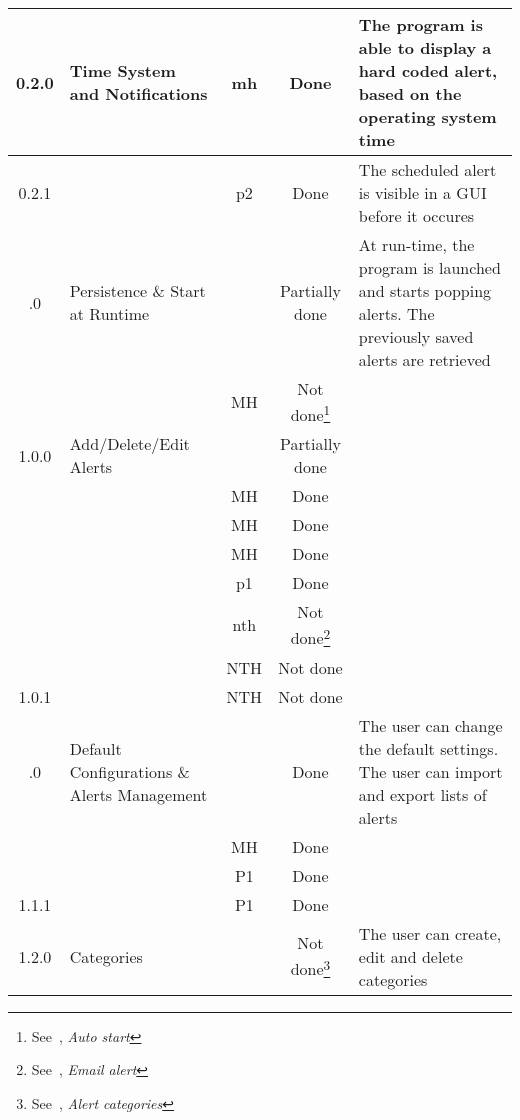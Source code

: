 \begin{longtable}{| c | p{5cm} | c | c | p{5cm} |}
	\rowcolor{aliceblue}0.2.0 & Time System and Notifications & \gls{mh} & Done & The program is able to display a hard coded alert, based on the operating system time \\ \hline
	\rowcolor{aliceblue}0.2.1 & \fullref{subsec:usecase_launch} & \gls{p2} & Done & The scheduled alert is visible in a GUI before it occures \\ \boldhr
	0.3.0 & Persistence \& Start at Runtime & & Partially done & At run-time, the program is launched and starts popping alerts. The previously saved alerts are retrieved \\ \hline
	& \fullref{subsec:usecase_auto_start} & MH & Not done\footnote{\label{ftn:autostart}See~\fullref{sec:unimplreq}, \textit{Auto start}} & \\ \boldhr
	\rowcolor{aliceblue}1.0.0 & Add/Delete/Edit Alerts & & Partially done &  \\ \hline
	\rowcolor{aliceblue}& \fullref{subsec:usecase_add_simple_alert} & MH & Done &  \\ \hline
	\rowcolor{aliceblue}& \fullref{subsec:usecase_delete_simple_alert} & MH & Done &  \\ \hline
	\rowcolor{aliceblue}& \fullref{subsec:usecase_edit_simple_alert} & MH & Done &  \\ \hline
	\rowcolor{aliceblue}& \fullref{subsec:usecase_add_periodic_alert} & \gls{p1} & Done &  \\ \hline
	\rowcolor{aliceblue}& \fullref{subsec:usecase_add_email_sender} & \gls{nth} & Not done\footnote{\label{ftn:emailreq}See~\fullref{sec:unimplreq}, \textit{Email alert}} &  \\ \hline
	\rowcolor{aliceblue}& \fullref{subsec:usecase_delete_email_sender} & NTH & Not done\footref{ftn:emailreq} &  \\ \hline
	\rowcolor{aliceblue}1.0.1 & \fullref{subsec:usecase_edit_email_sender} & NTH & Not done\footref{ftn:emailreq} &  \\ \boldhr
	1.1.0 & Default Configurations \& Alerts Management &  & Done & The user can change the default settings. The user can import and export lists of alerts\\ \hline
	& \fullref{subsec:usecase_edit_default_configuration} & MH & Done & \\ \hline
	& \fullref{subsec:usecase_import_alerts} & P1 & Done & \\ \hline
	1.1.1 & \fullref{subsec:usecase_export_alerts} & P1 & Done &\\ \boldhr
	\rowcolor{aliceblue}1.2.0 & Categories & & Not done\footnote{\label{ftn:categories}See~\fullref{sec:unimplreq}, \textit{Alert categories}} & The user can create, edit and delete categories \\ \hline

\end{longtable}
